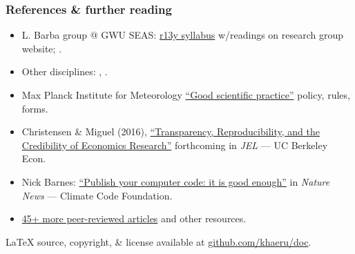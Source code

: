 \documentclass[12pt,aspectratio=169]{beamer}
\begin{document}
\begin{frame}[allowframebreaks]
\frametitle{References \& further reading}

\nocite{huppmann-2020}
\printbibliography[heading=none]

\begin{itemize}
  \small
  \item L. Barba group @ GWU SEAS: \href{http://lorenabarba.com/blog/barbagroup-reproducibility-syllabus/}{r13y syllabus} w/readings on research group website; .
  \item Other disciplines: \cite{irving-2016}, \cite{pauliuk-2019}.
  \item Max Planck Institute for Meteorology \href{http://mpimet.mpg.de/en/science/publications/good-scientific-practice.html}{``Good scientific practice''} policy, rules, forms.
  \item Christensen \& Miguel (2016), \href{http:/dx.doi.org/10.3386/w22989}{``Transparency, Reproducibility, and the Credibility of Economics Research''} forthcoming in \emph{JEL} — UC Berkeley Econ.
  \item Nick Barnes: \href{https://www.nature.com/news/2010/101013/full/467753a.html}{``Publish your computer code: it is good enough''} in \emph{Nature News} — Climate Code Foundation.
  \item \href{http://ropensci.github.io/reproducibility-guide/sections/references/}{45+ more peer-reviewed articles} and other resources.
\end{itemize}

\medskip
{}

LaTeX source, copyright, \& license available at \href{https://github.com/khaeru/doc/}{github.com/khaeru/doc}.
\medskip

\end{frame}
\end{document}
